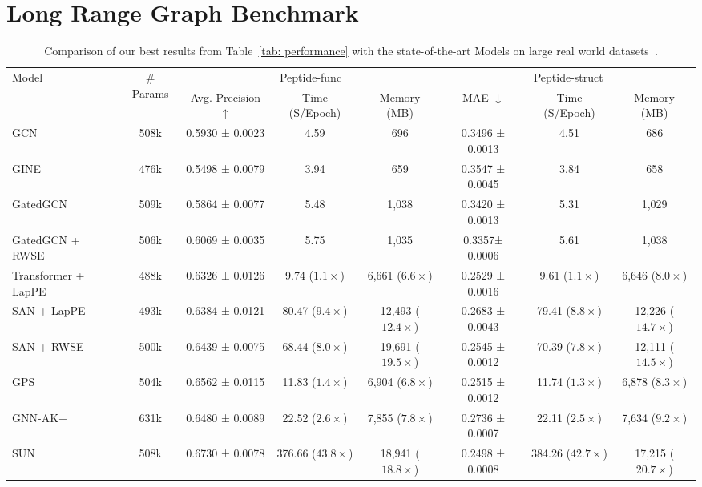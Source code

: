 \documentclass{article}
\begin{document}
\section{Long Range Graph Benchmark}\label{app sec: lrgb}
\begin{table}[!ht]
    \caption{Comparison of our best results from Table~\ref{tab: performance} with the state-of-the-art Models on large real world datasets~\citep{dwivedi2022long}.}
\scriptsize
    \centering
    \begin{tabular}{lccccccc}
    \toprule
         \multirow{2}{*}{Model} & \multirow{2}{*}{\# Params}
         &  \multicolumn{3}{c}{Peptide-func}
         &  \multicolumn{3}{c}{Peptide-struct} \\
         \cmidrule(lr){3-5} \cmidrule(lr){6-8}
         & & Avg. Precision  $\uparrow$ & Time (S/Epoch) & Memory (MB)
         & MAE $\downarrow$ & Time (S/Epoch) & Memory (MB)\\
         \midrule
         GCN & 508k
         & 0.5930 ± 0.0023 & 4.59 & 696
         & 0.3496 ± 0.0013 & 4.51 & 686\\
         GINE & 476k 
         & 0.5498 ± 0.0079 & 3.94 & 659
         & 0.3547 ± 0.0045 & 3.84 & 658 \\
         GatedGCN & 509k 
         & 0.5864 ± 0.0077 & 5.48 & 1,038
         & 0.3420 ± 0.0013 & 5.31 & 1,029\\
         GatedGCN + RWSE  & 506k 
         & 0.6069 ± 0.0035 & 5.75 & 1,035
         & 0.3357±  0.0006 & 5.61 & 1,038\\
         \midrule
         Transformer + LapPE & 488k 
         & 0.6326 ± 0.0126 & 9.74 ($1.1\times$) & 6,661 ($6.6\times$)
         & 0.2529 ± 0.0016 & 9.61 ($1.1\times$) & 6,646 ($8.0\times$)\\
         SAN + LapPE~\citep{chen2022structure_SAT} & 493k 
         & 0.6384 ± 0.0121 & 80.47 ($9.4\times$) & 12,493 ($12.4\times$) 
         & 0.2683 ± 0.0043 & 79.41 ($8.8\times$) &  12,226 ($14.7\times$)\\
         SAN + RWSE~\citep{chen2022structure_SAT} & 500k 
         & 0.6439 ± 0.0075 & 68.44 ($8.0\times$) & 19,691 ($19.5\times$)
         & 0.2545 ± 0.0012 & 70.39 ($7.8\times$) &12,111 ($14.5\times$)\\
         GPS~\citep{rampavsek2022recipe} & 504k
         & 0.6562 ± 0.0115 & 11.83 ($1.4\times$) & 6,904 ($6.8\times$)
         & 0.2515 ± 0.0012 & 11.74 ($1.3\times$)& 6,878 ($8.3\times$)\\
         
         \midrule
         GNN-AK+~\citep{zhao2021stars} & 631k
         &  0.6480 ± 0.0089 & 22.52 ($2.6\times$) & 7,855 ($7.8\times$)
         & 0.2736 ± 0.0007  & 22.11 ($2.5\times$) & 7,634 ($9.2\times$)\\
         SUN~\citep{sun} & 508k
         & 0.6730 ± 0.0078 & 376.66 ($43.8\times$) & 18,941 ($18.8\times$)
         & 0.2498 ± 0.0008 &  384.26 ($42.7\times$)& 17,215 ($20.7\times$)\\
         

\end{tabular}
\end{table}
\end{document}
